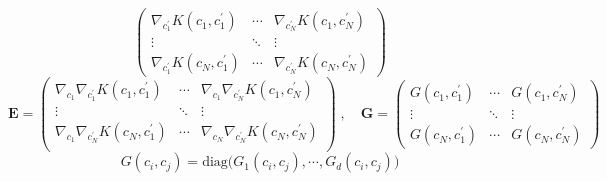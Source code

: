 \documentclass{beamer}
\begin{document}
\begin{frame}
\begin{equation*}
\begin{pmatrix}
            \nabla_{c_1^\prime} K(c_1, c_1^\prime) & \cdots & \nabla_{c_N^\prime} K(c_1, c_N^\prime) \\
            \vdots & \ddots & \vdots\\
            \nabla_{c_1^\prime} K(c_N, c_1^\prime) & \cdots & \nabla_{c_N^\prime} K(c_N, c_N^\prime) 
        \end{pmatrix}
    \end{equation*}
    \begin{equation*}
        \mathbf{E} =
        \begin{pmatrix}
            \nabla_{c_1} \nabla_{c_1^\prime} K(c_1, c_1^\prime) & \cdots &
            \nabla_{c_1} \nabla_{c_N^\prime} K(c_1, c_N^\prime)\\
            \vdots & \ddots & \vdots \\
            \nabla_{c_1} \nabla_{c_N^\prime} K(c_N, c_1^\prime) & \cdots &
            \nabla_{c_N} \nabla_{c_N^\prime} K(c_N, c_N^\prime)\\
        \end{pmatrix}\;,\quad
        {\mathbf{G}} =
        \begin{pmatrix}
            G(c_1, c_1^\prime) & \cdots & G(c_1, c_N^\prime) \\
            \vdots & \ddots & \vdots \\
            G(c_N, c_1^\prime) & \cdots & G(c_N, c_N^\prime)
        \end{pmatrix}
    \end{equation*}
    $$
        G(c_i, c_j) = \textrm{diag}\big(G_1(c_i, c_j), \cdots, G_d(c_i, c_j)\big)
    $$
\end{frame}
\end{document}
